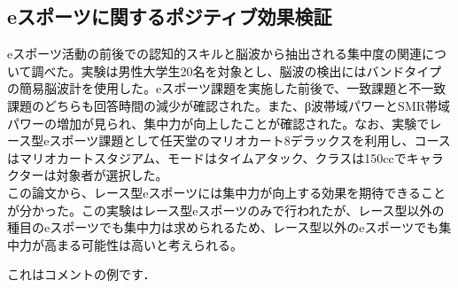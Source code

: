 \subsection{eスポーツに関するポジティブ効果検証}
eスポーツ活動の前後での認知的スキルと脳波から抽出される集中度の関連について調べた。実験は男性大学生20名を対象とし、脳波の検出にはバンドタイプの簡易脳波計を使用した。eスポーツ課題を実施した前後で、一致課題と不一致課題のどちらも回答時間の減少が確認された。また、β波帯域パワーとSMR帯域パワーの増加が見られ、集中力が向上したことが確認された。なお、実験でレース型eスポーツ課題として任天堂のマリオカート8デラックスを利用し、コースはマリオカートスタジアム、モードはタイムアタック、クラスは150ccでキャラクターは対象者が選択した。\cite{Dentsu2019}\\
この論文から、レース型eスポーツには集中力が向上する効果を期待できることが分かった。この実験はレース型eスポーツのみで行われたが、レース型以外の種目のeスポーツでも集中力は求められるため、レース型以外のeスポーツでも集中力が高まる可能性は高いと考えられる。



これはコメントの例です．

\fi